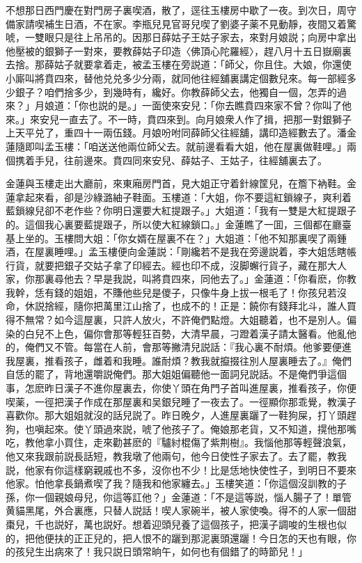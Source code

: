 不想那日西門慶在對門房子裏喫酒，散了，逕往玉樓房中歇了一夜。到次日，周守備家請喫補生日酒，不在家。李瓶兒見官哥兒喫了劉婆子薬不見動靜，夜間又着驚唬，一雙眼只是往上吊吊的。因那日薛姑子王姑子家去，來對月娘説；向房中拿出他壓被的銀獅子一對來，要教薛姑子印造〈佛頂心陀羅經〉，趕八月十五日嶽廟裏去捨。那薛姑子就要拿着走，被孟玉樓在旁説道：「師父，你且住。大娘，你還使小廝叫將賁四來，替他兑兑多少分兩，就同他往經舖裏講定個數兒來。每一部經多少銀子？咱們捨多少，到幾時有，纔好。你教薛師父去，他獨自一個，怎弄的過來？」月娘道：「你也説的是。」一面使來安兒：「你去瞧賁四來家不曾？你叫了他來。」來安兒一直去了。不一時，賁四來到。向月娘衆人作了揖，把那一對銀獅子上天平兑了，重四十一兩伍錢。月娘吩咐同薛師父往經舖，講印造經數去了。潘金蓮隨即叫孟玉樓：「咱送送他兩位師父去。就前邊看看大姐，他在屋裏做鞋哩。」兩個携着手兒，往前邊來。賁四同來安兒、薛姑子、王姑子，往經舖裏去了。

金蓮與玉樓走出大廳前，來東廂房門首，見大姐正守着針線筐兒，在簷下衲鞋。金蓮拿起來看，卻是沙綠潞紬子鞋面。玉樓道：「大姐，你不要這紅鎖線子，爽利着藍鎖線兒卻不老作些？你明日還要大紅提跟子。」大姐道：「我有一雙是大紅提跟子的。這個我心裏要藍提跟子，所以使大紅線鎖口。」金蓮瞧了一囬，三個都在廳臺基上坐的。玉樓問大姐：「你女婿在屋裏不在？」大姐道：「他不知那裏喫了兩鍾酒，在屋裏睡哩。」孟玉樓便向金蓮説：「剛纔若不是我在旁邊説着，李大姐恁瞎帳行貨，就要把銀子交姑子拿了印經去。經也印不成，沒脚蠏行貨子，藏在那大人家，你那裏尋他去？早是我説，叫將賁四來，同他去了。」金蓮道：「你看麽，你教我幹，恁有錢的姐姐，不賺他些兒是儍子，只像牛身上拔一根毛了！你孩兒若沒命，休説捨經，隨你把萬里江山捨了，也成不的！正是：饒你有錢拜北斗，誰人買得不無常？如今這屋裏，只許人放火，不許俺們點燈。大姐聽着，也不是別人。偏染的白兒不上色，偏你會那等輕狂百勢，大清早晨，刁蹬着漢子請太醫看。他亂他的，俺們又不管。每當在人前，會那等撇清兒説話：『我心裏不耐煩。他爹要便進我屋裏，推看孩子，雌着和我睡。誰耐煩？教我就攛掇往別人屋裏睡去了。』俺們自恁的罷了，背地還嚼説俺們。那大姐姐偏聽他一面詞兒説話。不是俺們爭這個事，怎麽昨日漢子不進你屋裏去，你使丫頭在角門子首叫進屋裏，推看孩子，你便喫薬，一徑把漢子作成在那屋裏和吴銀兒睡了一夜去了。一徑顯你那乖覺，教漢子喜歡你。那大姐姐就沒的話兒説了。昨日晚夕，人進屋裏躧了一鞋狗屎，打丫頭趕狗，也嗔起來。使丫頭過來説，唬了他孩子了。俺娘那老貨，又不知道，㨪他那嘴吃，教他拿小買住，走來勸甚麽的『驢紂棍傷了紫荆樹』。我惱他那等輕聲浪氣，他又來我跟前説長話短，教我墩了他兩句，他今日使性子家去了。去了罷，教我説，他家有你這樣窮親戚也不多，沒你也不少！比是恁地快使性子，到明日不要來他家。怕他拿長鍋煮喫了我？隨我和他家纏去。」玉樓笑道：「你這個沒訓教的子孫，你一個親娘母兒，你這等訌他？」金蓮道：「不是這等説，惱人腸子了！單管黄貓黑尾，外合裏應，只替人説話！喫人家碗半，被人家使喚。得不的人家一個甜棗兒，千也説好，萬也説好。想着迎頭兒養了這個孩子，把漢子調唆的生根也似的，把他便扶的正正兒的，把人恨不的躧到那泥裏頭還躧！今日怎的天也有眼，你的孩兒生出病來了！我只説日頭常晌午，如何也有個錯了的時節兒！」

